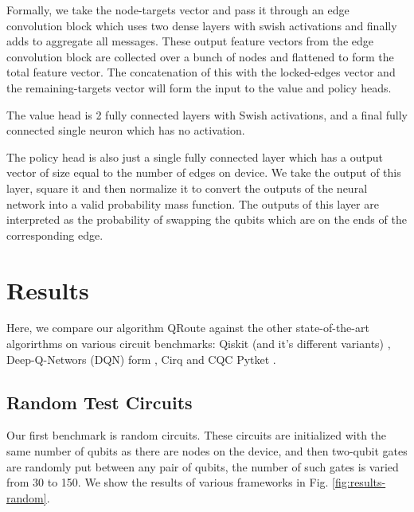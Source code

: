 \documentclass[%
 reprint,
 amsmath,amssymb,
 aps,
]{revtex4-2}
\begin{document}
Formally, we take the node-targets vector and pass it through an edge convolution block \cite{nn_edge_conv} which uses two dense layers with swish activations \cite{nn_swish} and finally adds to aggregate all messages. These output feature vectors from the edge convolution block are collected over a bunch of nodes and flattened to form the total feature vector. The concatenation of this with the locked-edges vector and the remaining-targets vector will form the input to the value and policy heads.

The value head is 2 fully connected layers with Swish activations, and a final fully connected single neuron which has no activation.

The policy head is also just a single fully connected layer which has a output vector of size equal to the number of edges on device. We take the output of this layer, square it and then normalize it to convert the outputs of the neural network into a valid probability mass function. The outputs of this layer are interpreted as the probability of swapping the qubits which are on the ends of the corresponding edge.

\section{\label{sec:results}Results}
Here, we compare our algorithm QRoute against the other state-of-the-art algorirthms on various circuit benchmarks: Qiskit (and it's different variants) \citep{comp_qiskit}, Deep-Q-Networs (DQN) form \citep{qroute_dqn2}, Cirq \citep{comp_cirq} and CQC Pytket \citep{comp_pytket}.

\subsection{\label{sec:results-random}Random Test Circuits}

Our first benchmark is random circuits. These circuits are initialized with the same number of qubits as there are nodes on the device, and then two-qubit gates are randomly put between any pair of qubits, the number of such gates is varied from 30 to 150. We show the results of various frameworks in Fig. \ref{fig:results-random}.
\end{document}
